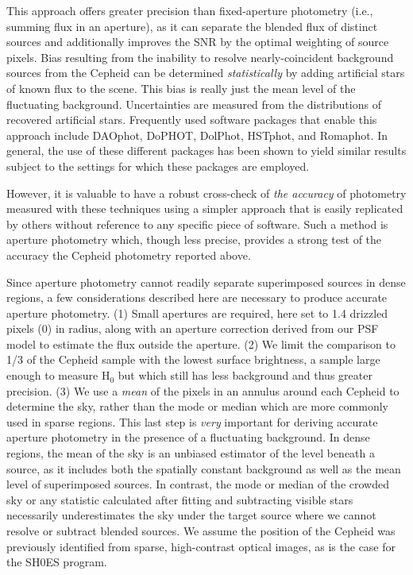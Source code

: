 \documentclass[12pt]{aastex631}
\begin{document}
\begin{appendices}
This approach offers greater precision than fixed-aperture photometry (i.e., summing flux in an aperture), as it can separate the blended flux of distinct sources and additionally improves the SNR by the optimal weighting of source pixels.  Bias resulting from the inability to resolve nearly-coincident background sources from the Cepheid can be determined {\it statistically} by adding artificial stars of known flux to the scene.  This bias is really just the mean level of the fluctuating background. Uncertainties are measured from the distributions of recovered artificial stars.   Frequently used software packages that enable this approach include DAOphot, DoPHOT, DolPhot, HSTphot, and Romaphot.  In general, the use of these different packages has been shown to yield similar results subject to the settings for which these packages are employed.
   
However, it is valuable to have a robust cross-check of {\it the accuracy} of photometry measured with these techniques using a simpler approach that is easily replicated by others without reference to any specific piece of software.  Such a method is aperture photometry which, though less precise, provides a strong test of the accuracy the Cepheid photometry reported above.
   
Since aperture photometry cannot readily separate superimposed sources in dense regions, a few considerations described here are necessary to produce accurate aperture photometry. (1) Small apertures are required, here set to 1.4 drizzled pixels (0) in radius, along with an aperture correction derived from our PSF model to estimate the flux outside the aperture. (2) We limit the comparison to 1/3 of the Cepheid sample with the lowest surface brightness, a sample large enough to measure H$_0$ but which still has less background and thus greater precision. (3) We use a {\it mean} of the pixels in an annulus around each Cepheid to determine the sky, rather than the mode or median which are more commonly used in sparse regions.  This last step is {\it very} important for deriving accurate aperture photometry in the presence of a fluctuating background.  In dense regions, the mean of the sky is an unbiased estimator of the level beneath a source, as it includes both the spatially constant background as well as the mean level of superimposed sources. In contrast, the mode or median of the crowded sky or any statistic calculated after fitting and subtracting visible stars necessarily underestimates the sky under the target source where we cannot resolve or subtract blended sources. We assume the position of the Cepheid was previously identified from sparse, high-contrast optical images, as is the case for the SH0ES program.
   

\end{appendices}
\end{document}
